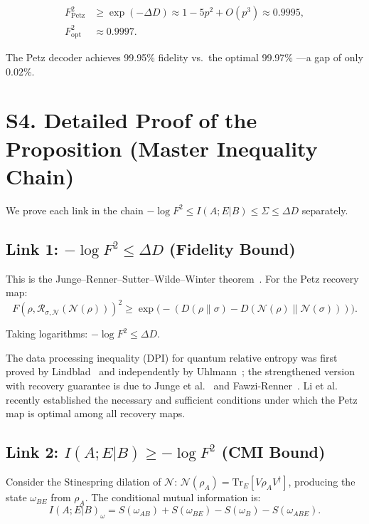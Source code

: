 \documentclass[prl,twocolumn,superscriptaddress,longbibliography]{revtex4-2}
\newcommand{\Tr}{\mathrm{Tr}}
\newcommand{\Petz}{\mathcal{R}}
\newcommand{\chan}{\mathcal{N}}
\begin{document}
\begin{align}
F_{\mathrm{Petz}}^2 &\geq \exp(-\Delta D) \approx 1 - 5p^2 + O(p^3)
\approx 0.9995, \\
F_{\mathrm{opt}}^2 &\approx 0.9997.
\end{align}

The Petz decoder achieves 99.95\% fidelity vs.\ the optimal 99.97\%
---a gap of only $0.02\%$.

\section{S4. Detailed Proof of the Proposition (Master Inequality Chain)}
\label{sec:proof_theorem3}

We prove each link in the chain
$-\log F^2 \leq I(A;E|B) \leq \Sigma \leq \Delta D$ separately.

\subsection{Link 1: $-\log F^2 \leq \Delta D$ (Fidelity Bound)}

This is the Junge--Renner--Sutter--Wilde--Winter
theorem~\cite{Junge2018}. For the Petz recovery map:
\begin{equation}
F(\rho, \Petz_{\sigma,\chan}(\chan(\rho)))^2
\geq \exp\!\big(-(D(\rho\|\sigma) - D(\chan(\rho)\|\chan(\sigma)))\big).
\end{equation}

Taking logarithms: $-\log F^2 \leq \Delta D$.

The data processing inequality (DPI) for quantum relative entropy was first proved by Lindblad~\cite{Lindblad1975} and independently by Uhlmann~\cite{Uhlmann1977}; the strengthened version with recovery guarantee is due to Junge et al.~\cite{Junge2018} and Fawzi-Renner~\cite{Fawzi2015}. Li et al.~\cite{LiWangZheng2025} recently established the necessary and sufficient conditions under which the Petz map is optimal among all recovery maps.

\subsection{Link 2: $I(A;E|B) \geq -\log F^2$ (CMI Bound)}

Consider the Stinespring dilation of $\chan$:
$\chan(\rho_A) = \Tr_E[V \rho_A V^\dagger]$, producing the state
$\omega_{BE}$ from $\rho_A$. The conditional mutual information is:
\begin{equation}
I(A;E|B)_\omega = S(\omega_{AB}) + S(\omega_{BE}) - S(\omega_B) -
S(\omega_{ABE}).
\end{equation}
\end{document}
